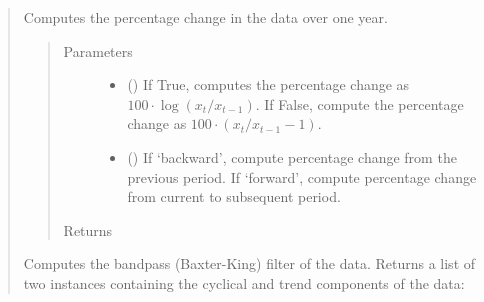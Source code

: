 \documentclass[letterpaper,10pt,openany,oneside,english]{sphinxmanual}
\begin{document}
\begin{fulllineitems}
\begin{quote}
\begin{fulllineitems}
\label{\detokenize{series_class:fredpy.series.apc}}
Computes the percentage change in the data over one year.
\begin{quote}\begin{description}
\item[{Parameters}] \leavevmode\begin{itemize}
\item {} 
 () \textendash{} If True, computes the percentage change as \(100\cdot\log(x_{t}/x_{t-1})\). If False, compute the percentage change as \(100\cdot\left( x_{t}/x_{t-1} - 1\right)\).

\item {} 
 () \textendash{} If ‘backward’, compute percentage change from the previous period. If ‘forward’, compute percentage change from current to subsequent period.

\end{itemize}

\item[{Returns}] \leavevmode
{\hyperref[\detokenize{series_class:fredpy.series}]{}}

\end{description}\end{quote}

\end{fulllineitems}


\begin{fulllineitems}
\label{\detokenize{series_class:fredpy.series.bpfilter}}
Computes the bandpass (Baxter-King) filter of the data. Returns a list of two {\hyperref[\detokenize{series_class:fredpy.series}]{}} instances containing the cyclical and trend components of the data:
\begin{quote}


\end{quote}
\end{fulllineitems}
\end{quote}
\end{fulllineitems}
\end{document}

